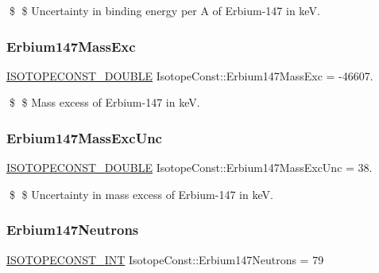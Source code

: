 \$ \$ Uncertainty in binding energy per A of Erbium-\/147 in keV. \mbox{\label{group___isotope_const-_erbium-_er147_ga8ed08793e55fecfb167f92b6ec41c962}} 
\subsubsection{\texorpdfstring{Erbium147\+Mass\+Exc}{Erbium147MassExc}}
{\footnotesize\ttfamily \mbox{\hyperlink{group___isotope_const-_macros_ga8f45a7272ce02c0b4c65c44636ed719a}{I\+S\+O\+T\+O\+P\+E\+C\+O\+N\+S\+T\+\_\+\+D\+O\+U\+B\+LE}} Isotope\+Const\+::\+Erbium147\+Mass\+Exc = -\/46607.}

\$ \$ Mass excess of Erbium-\/147 in keV. \mbox{\label{group___isotope_const-_erbium-_er147_gaf6100b5a9d361a8a17862cdd8bc641ba}} 
\subsubsection{\texorpdfstring{Erbium147\+Mass\+Exc\+Unc}{Erbium147MassExcUnc}}
{\footnotesize\ttfamily \mbox{\hyperlink{group___isotope_const-_macros_ga8f45a7272ce02c0b4c65c44636ed719a}{I\+S\+O\+T\+O\+P\+E\+C\+O\+N\+S\+T\+\_\+\+D\+O\+U\+B\+LE}} Isotope\+Const\+::\+Erbium147\+Mass\+Exc\+Unc = 38.}

\$ \$ Uncertainty in mass excess of Erbium-\/147 in keV. \mbox{\label{group___isotope_const-_erbium-_er147_gacda56a3b7029c0113ea40668590cd932}} 
\subsubsection{\texorpdfstring{Erbium147\+Neutrons}{Erbium147Neutrons}}
{\footnotesize\ttfamily \mbox{\hyperlink{group___isotope_const-_macros_ga5f18360b3e99483a35c32d789e62621c}{I\+S\+O\+T\+O\+P\+E\+C\+O\+N\+S\+T\+\_\+\+I\+NT}} Isotope\+Const\+::\+Erbium147\+Neutrons = 79}

